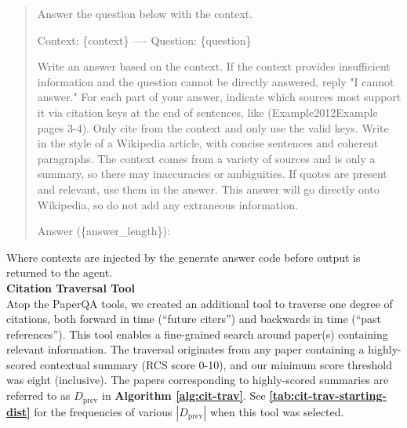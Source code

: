 \documentclass{article}
\begin{document}
\begin{quote}
Answer the question below with the context.

Context:
\{context\}
----
Question: \{question\}

Write an answer based on the context. If the context provides insufficient information and the question cannot be directly answered, reply "I cannot answer." For each part of your answer, indicate which sources most support it via citation keys at the end of sentences, like (Example2012Example pages 3-4). Only cite from the context and only use the valid keys. Write in the style of a Wikipedia article, with concise sentences and coherent paragraphs. The context comes from a variety of sources and is only a summary, so there may inaccuracies or ambiguities. If quotes are present and relevant, use them in the answer. This answer will go directly onto Wikipedia, so do not add any extraneous information.

Answer (\{answer\_length\}):
\end{quote}

Where contexts are injected by the generate answer code before output is returned to the agent. \\

\textbf{Citation Traversal Tool} \\

Atop the PaperQA\cite{lala2023paperqa} tools, we created an additional tool to traverse one degree of citations, both forward in time (``future citers'') and backwards in time (``past references''). This tool enables a fine-grained search around paper(s) containing relevant information. The traversal originates from any paper containing a highly-scored contextual summary (RCS score 0-10), and our minimum score threshold was eight (inclusive). The papers corresponding to highly-scored summaries are referred to as $D_\text{prev}$ in \textbf{Algorithm \ref{alg:cit-trav}}. See \textbf{\autoref{tab:cit-trav-starting-dist}} for the frequencies of various $|D_\text{prev}|$ when this tool was selected.
\end{document}
